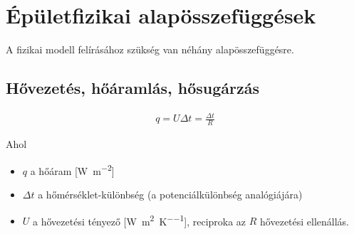 \begin{table}[H]
	\footnotesize
	\centering
	\caption{Egy szoba határoló felületei és azok termikus tulajdonságai}
	\renewcommand{\arraystretch}{2} %
	
	
	
	
	
	\label{table_house_parameters}
	
	
\end{table}

\begin{table}[H]
	\footnotesize
	\centering
	\caption{Jelölések}
	
	\label{tab:Nomenclature}
\end{table}
\section{Épületfizikai alapösszefüggések}
 
 A fizikai modell felírásához szükség van néhány alapösszefüggésre.
 
 \vspace{18pt}
 
\subsection*{Hővezetés, hőáramlás, hősugárzás}

\begin{equation} \label{eq_hoaram_alap}
\begin{aligned}
q = U\Delta t = \frac{\Delta t}{R}
\end{aligned}
\end{equation}

Ahol 

\begin{itemize}[itemsep=6pt,topsep=0pt,parsep=0pt,partopsep=0pt]
	\item[] $q$ a hőáram [\si[per-mode=fraction]{\watt\per\metre\squared}]
	\item[] $\Delta t$ a hőmérséklet-különbség (a potenciálkülönbség analógiájára)
	\item[] $U$ a hővezetési tényező [\si[per-mode=fraction]{\watt\per\metre\squared\per\kelvin}], reciproka az $R$ hővezetési ellenállás.
\end{itemize}


